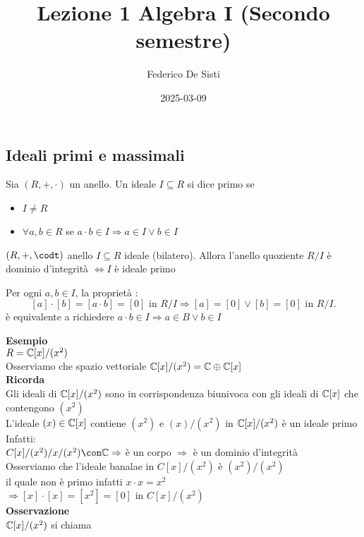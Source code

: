 \documentclass[12px]{article}
\title{Lezione 1 Algebra I (Secondo semestre)}
\date{2025-03-09}
\author{Federico De Sisti}
\begin{document}
	\maketitle
	\newpage
	\subsection{Ideali primi e massimali}
	\begin{defi}
		Sia $(R, +, \cdot)$ un anello. Un ideale $I\subseteq R$ si dice primo se
		 \begin{itemize}
			 \item $I\neq R$
			 \item $\forall a,b\in R$ se $a\cdot b\in I \Rightarrow a\in I \vee b\in I$
		\end{itemize}
	\end{defi}
	\begin{teo}
		$(R,+,\codt)$ anello $I\subseteq R$ ideale (bilatero). Allora l'anello quoziente $R/I$ è dominio d'integrità $ \Leftrightarrow I$ è ideale primo
	\end{teo}
	\begin{dimo}
		Per ogni $a,b\in I$, la proprietà :
		\[
			[a]\cdot[b] = [a\cdot b] = [0] \text { in } R/I \Rightarrow [a] = [0] \vee [b] = [0] \text{ in } R/I
		.\] 
		è equivalente a richiedere $a\cdot b \in I  \Rightarrow a\in B \vee b\in I$
	\end{dimo}
	\textbf{Esempio}\\
	$R = \mathbb{C}[x]/(x^2)$\\
	Osserviamo che spazio vettoriale  $\mathbb{C}[x]/(x^2) = \mathbb{C}\oplus \mathbb{C}[x]$ \\
	\textbf{Ricorda}\\
	Gli ideali di $\mathbb{C}[x]/(x^2)$ sono in corrispondenza biunivoca con gli ideali di  $\mathbb{C}[x]$ che contengono $(x^2)$\\
	L'ideale  $(x)\in\mathbb{C}[x]$ contiene $(x^2)$ e $(x)/(x^2)$ in $\mathbb{C}[x]/(x^2)$ è un ideale primo\\
	Infatti:\\
	$C[x]/(x^2)/x/(x^2)\con \C \Rightarrow $ è un corpo $ \Rightarrow  $ è un dominio d'integrità\\
	Osserviamo che l'ideale banalae in $C[x]/(x^2)$ è  $(x^2)/(x^2)$\\
	il quale non è primo infatti  $x\cdot x = x^2$\\
	$ \Rightarrow [x]\cdot[x] = [x^2] = [0] $ in $C[x]/(x^2)$\\
	 \textbf{Osservazione}\\
	 $\mathbb{C}[x]/(x^2)$ si chiama
\end{document}
